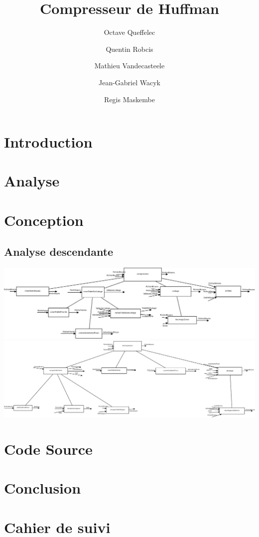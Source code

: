 \documentclass{article}
\title{Compresseur de Huffman}
\author{Octave Queffelec \and Quentin Robcis \and Mathieu Vandecasteele \and Jean-Gabriel Wacyk \and Regis Maskembe}
\begin{document}
\maketitle
\newpage


\tableofcontents
\newpage


\section{Introduction}


\newpage
\section{Analyse}


\newpage
\section{Conception}
\subsection{Analyse descendante}
\includegraphics[width=500pt,angle=90, origin=c]{./input/Compression_Analysedescendante.jpeg}
\includegraphics[width=500pt,angle=90, origin=c]{./input/decompression_analyse.jpeg}



\newpage
\section{Code Source}


\newpage
\section{Conclusion}


\newpage
\section{Cahier de suivi}

\end{document}
